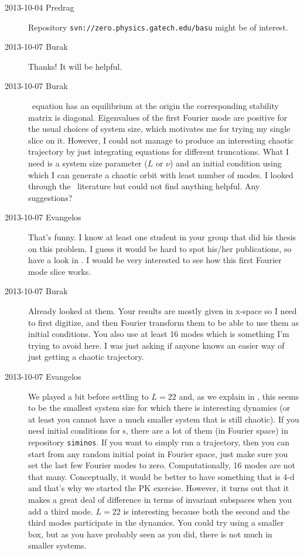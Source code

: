 \begin{description}
\item[2013-10-04 Predrag]
Repository \texttt{svn://zero.physics.gatech.edu/basu} might be of interest.

\item[2013-10-07 Burak] Thanks! It will be helpful.

\item[2013-10-07 Burak] \KS\ equation has an equilibrium at the origin the
corresponding stability matrix is diagonal. Eigenvalues of the first Fourier
mode are positive for the usual choices of system size, which motivates me
for trying my single slice on it. However, I could not manage to produce an
interesting chaotic trajectory by just integrating equations for different
truncations. What I need is a system size parameter ($L$ or $\nu$) and an
initial condition using which I can generate a chaotic orbit with least
number of modes. I looked through the \KS\ literature but could not find
anything helpful. Any suggestions?

\item[2013-10-07 Evangelos] That's funny. I know at least one student in your
group that did his thesis on this problem. I guess it would be hard to spot
his/her publications, so have a look in .
I would be very interested to see how this first Fourier mode slice works.

\item[2013-10-07 Burak] Already looked at them. Your results are mostly
given in x-space so I need to first digitize, and then Fourier transform
them to be able to use them as initial conditions. You also use at least
16 modes which is something I'm trying to avoid here. I was just asking
if anyone knows an easier way of just getting a chaotic trajectory.

\item[2013-10-07 Evangelos] We played a bit before settling to $L=22$ and,
as we explain in , this seems to be the smallest
system size for which there is interesting dynamics (or at least you cannot
have a much smaller system that is still chaotic). If you need initial
conditions for \rpo s, there are a lot of them (in Fourier space) in repository
\texttt{siminos}. If you want to simply run a trajectory, then you can start
from any random initial point in Fourier space, just make sure you set
the last few Fourier modes to zero. Computationally, 16 modes are not that many.
Conceptually, it would be better to have something that is 4-d and that's
why we started the PK exercise. However, it turns out that it makes
a great deal of difference in terms of invariant subspaces
when you add a third mode. $L=22$ is interesting because both the second
and the third modes participate in the dynamics. You could try using a smaller
box, but as you have probably seen as you did, there is not much in smaller
systems.


\end{description}
